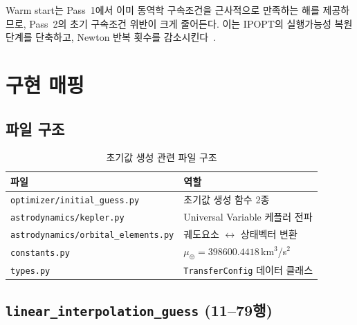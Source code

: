 \documentclass[11pt]{article}
\begin{document}
Warm start는 Pass~1에서 이미 동역학 구속조건을 근사적으로 만족하는 해를 제공하므로,
Pass~2의 초기 구속조건 위반이 크게 줄어든다.
이는 IPOPT의 실행가능성 복원 단계를 단축하고, Newton 반복 횟수를 감소시킨다~\cite{Wachter2006}.


\section{구현 매핑}
\label{sec:implementation}

\subsection{파일 구조}
\label{sec:file_structure}

\begin{table}[htbp]
\centering
\caption{초기값 생성 관련 파일 구조}
\label{tab:file_structure}
\begin{tabular}{@{}ll@{}}
\toprule
파일 & 역할 \\
\midrule
\texttt{optimizer/initial\_guess.py} & 초기값 생성 함수 2종 \\
\texttt{astrodynamics/kepler.py} & Universal Variable 케플러 전파 \\
\texttt{astrodynamics/orbital\_elements.py} & 궤도요소 $\leftrightarrow$ 상태벡터 변환 \\
\texttt{constants.py} & $\mu_\oplus = 398600.4418$\,km$^3$/s$^2$ \\
\texttt{types.py} & \texttt{TransferConfig} 데이터 클래스 \\
\bottomrule
\end{tabular}
\end{table}


\subsection{\texttt{linear\_interpolation\_guess} (11--79행)}
\label{sec:impl_linear}
\end{document}
